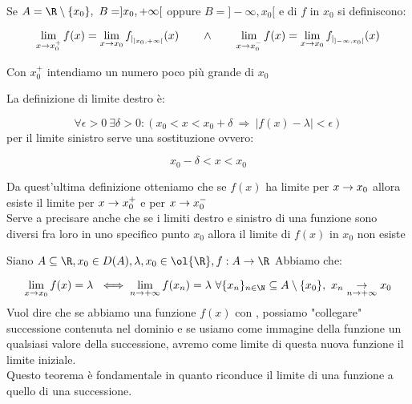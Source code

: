 \documentclass[../analisi.tex]{subfiles}
\begin{document}
\begin{defn}
Se $A = \R \setminus \{ x_0 \}, \ B = ] x_0, +\infty [ $ oppure $B = ] -\infty
, x_0[$  e  di $f$ in $x_0$ si definiscono:


\begin{equation}
	\lim \limits_{x \to x_0^+} f(x) = \lim \limits_{x \to x_0} f_{|_{]x_0, +\infty[}}(x) \qquad
	\land \qquad
	\lim \limits_{x \to x_0^-} f(x) = \lim \limits_{x \to x_0} f_{|_{]-\infty, x_0[}}(x)
\end{equation}
\end{defn}
Con $x_0^+$ intendiamo un numero poco più grande di $x_0$


\begin{defn}
La definizione di limite destro è:

\begin{equation}
	\forall \epsilon > 0\ \exists \delta > 0: ( x_0 < x < x_0 + \delta\
	\Longrightarrow\ |f(x) - \lambda| < \epsilon)
\end{equation}
per il limite sinistro serve una sostituzione ovvero:

\begin{equation}
	x_0 - \delta < x < x_0
\end{equation}
\end{defn}
Da quest'ultima definizione otteniamo che se $f(x)$ ha limite per $ x \to x_0$ allora 
esiste il limite per $x \to x_0^+$ e per $x \to x_0^-$\\
Serve a precisare anche che se i limiti destro e sinistro di una 
funzione sono diversi fra loro in uno specifico punto $x_0$ allora
il limite di $f(x)$ in $x_0$ non esiste


\begin{defn}
Siano $\acr, x_0 \in D(A), \lambda, x_0 \in \ol{\R}, f: A \to \R$
Abbiamo che:

\begin{equation}
	\limxo f(x) = \lambda \ \iff \lim \limits_{\nti} f(x_n) = \lambda\
	\forall \{ x_n \}_{n \in \N} \subseteq A \setminus \{ x_0 \},\
	x_n \underset{\nti}{\to} x_0
\end{equation}
Vuol dire che se abbiamo una funzione $f(x)$ con \bt{limite}, possiamo 
"collegare" \bt{ogni} successione contenuta nel dominio e se usiamo 
come immagine della funzione un qualsiasi valore della successione, avremo come
limite di questa nuova funzione il limite iniziale.\\
Questo teorema è fondamentale in quanto riconduce il limite di una funzione a 
quello di una successione.
\end{defn}
\end{document}
